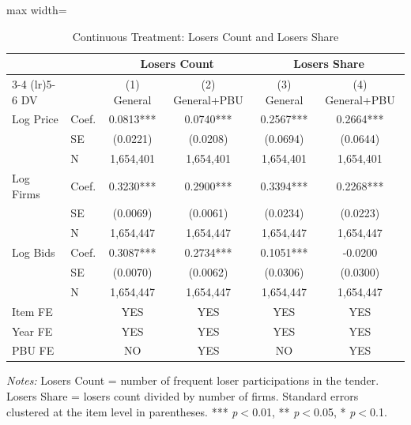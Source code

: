\begin{table}[htbp]
\centering
\caption{Continuous Treatment: Losers Count and Losers Share}
\label{tab:continuous_treatment}
\begin{adjustbox}{max width=\textwidth}
\begin{threeparttable}
\small
\begin{tabular}{llcccc}
\toprule
 & & \multicolumn{2}{c}{Losers Count} & \multicolumn{2}{c}{Losers Share} \\
\cmidrule(lr){3-4} \cmidrule(lr){5-6}
DV & & (1) General & (2) General+PBU & (3) General & (4) General+PBU \\
\midrule
Log Price & Coef. & 0.0813*** & 0.0740*** & 0.2567*** & 0.2664*** \\
 & SE & (0.0221) & (0.0208) & (0.0694) & (0.0644) \\
 & N & 1,654,401 & 1,654,401 & 1,654,401 & 1,654,401 \\
[3pt]
Log Firms & Coef. & 0.3230*** & 0.2900*** & 0.3394*** & 0.2268*** \\
 & SE & (0.0069) & (0.0061) & (0.0234) & (0.0223) \\
 & N & 1,654,447 & 1,654,447 & 1,654,447 & 1,654,447 \\
[3pt]
Log Bids & Coef. & 0.3087*** & 0.2734*** & 0.1051*** & -0.0200 \\
 & SE & (0.0070) & (0.0062) & (0.0306) & (0.0300) \\
 & N & 1,654,447 & 1,654,447 & 1,654,447 & 1,654,447 \\
\midrule
Item FE & & YES & YES & YES & YES \\
Year FE & & YES & YES & YES & YES \\
PBU FE & & NO & YES & NO & YES \\
\bottomrule
\end{tabular}
\begin{tablenotes}
\small
\item \textit{Notes:} Losers Count = number of frequent loser participations in the tender.
Losers Share = losers count divided by number of firms.
Standard errors clustered at the item level in parentheses.
*** \textit{p}$<$0.01, ** \textit{p}$<$0.05, * \textit{p}$<$0.1.
\end{tablenotes}
\end{threeparttable}
\end{adjustbox}
\end{table}
